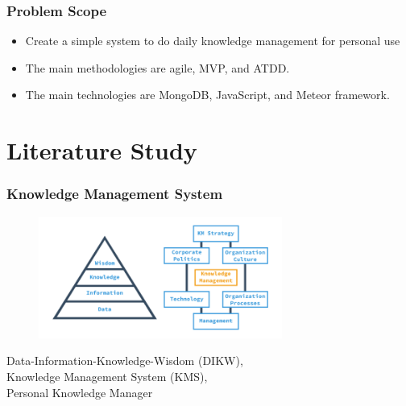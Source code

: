 \documentclass[10pt, compress]{beamer}
\begin{document}

\begin{frame}[fragile]
  \frametitle{Problem Scope}

  \begin{itemize} \itemsep0pt
    \item Create a \alert{simple system} to do \alert{daily knowledge management} for \alert{personal} use
    \item The main methodologies are \alert{agile}, \alert{MVP}, and \alert{ATDD}.
    \item The main technologies are \alert{MongoDB}, \alert{JavaScript}, and \alert{Meteor framework}.
  \end{itemize}

\end{frame}


\section{Literature Study}


\begin{frame}[fragile]
  \frametitle{Knowledge Management System}
  \centering

  \begin{figure}[ht]
    \vspace{-2cm}
    \includegraphics[width=8cm]{include/literature-kms.png}
  \end{figure}

  Data-Information-Knowledge-Wisdom (\alert{DIKW}),\\
  Knowledge Management System (\alert{KMS}),\\
  \alert{Personal Knowledge Manager}

\end{frame}
\end{document}
